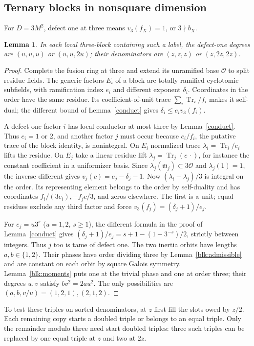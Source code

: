 \documentclass[11pt]{amsart}
\numberwithin{equation}{section}
\newtheorem{lemma}[theorem]{Lemma}
\DeclareMathOperator{\Tr}{Tr}
\begin{document}
\subsection{Ternary blocks in nonsquare dimension}
For $D=3M^2$, defect one at three means $v_3(f_X)=1$, or $3\nmid b_X$.
\begin{lemma}\label{ns:ternary}
In each local three-block containing such a label, the defect-one degrees are $(u,u,u)$ or $(u,u,2u)$; their denominators are $(z,z,z)$ or $(z,2z,2z)$.
\end{lemma}
\begin{proof}
Complete the fusion ring at three and extend its unramified base $\mathcal O$ to split residue fields. The generic factors $E_i$ of a block are totally ramified cyclotomic subfields, with ramification index $e_i$ and different exponent $\delta_i$. Coordinates in the order have the same residue. Its coefficient-of-unit trace $\sum_i\Tr_i/f_i$ makes it self-dual; the different bound of Lemma~\ref{conduct} gives $\delta_i\le e_iv_3(f_i)$.

A defect-one factor $i$ has local conductor at most three by Lemma~\ref{conduct}. Thus $e_i=1$ or $2$, and another factor $j$ must occur because $e_i/f_i$, the putative trace of the block identity, is nonintegral. On $E_i$ normalized trace $\lambda_i=\Tr_i/e_i$ lifts the residue. On $E_j$ take a linear residue lift $\lambda_j=\Tr_j(c\,\cdot)$, for instance the constant coefficient in a uniformizer basis. Since $\lambda_j(\mathfrak m_j)\subset3\mathcal O$ and $\lambda_j(1)=1$, the inverse different gives $v_j(c)=e_j-\delta_j-1$. Now $(\lambda_i-\lambda_j)/3$ is integral on the order. Its representing element belongs to the order by self-duality and has coordinates $f_i/(3e_i),-f_jc/3$, and zeros elsewhere. The first is a unit; equal residues exclude any third factor and force $v_3(f_j)=(\delta_j+1)/e_j$.

For $e_j=u3^s$ ($u=1,2$, $s\ge1$), the different formula in the proof of Lemma~\ref{conduct} gives $(\delta_j+1)/e_j=s+1-(1-3^{-s})/2$, strictly between integers. Thus $j$ too is tame of defect one. The two inertia orbits have lengths $a,b\in\{1,2\}$. Their phases have order dividing three by Lemma~\ref{blk:admissible} and are constant on each orbit by square Galois symmetry. Lemma~\ref{blk:moments} puts one at the trivial phase and one at order three; their degrees $u,v$ satisfy $bv^2=2au^2$. The only possibilities are $(a,b,v/u)=(1,2,1),(2,1,2)$.
\end{proof}
To test these triples on sorted denominators, at $z$ first fill the slots owed by $z/2$. Each remaining copy starts a doubled triple or belongs to an equal triple. Only the remainder modulo three need start doubled triples: three such triples can be replaced by one equal triple at $z$ and two at $2z$.
\end{document}
